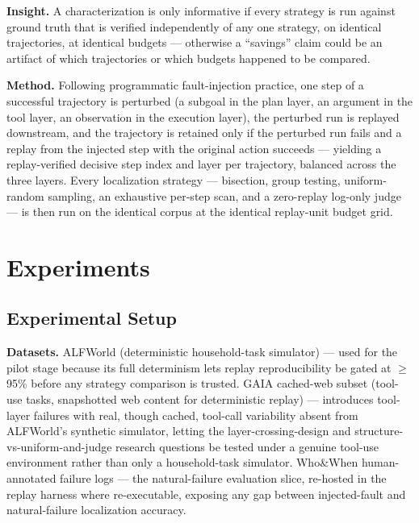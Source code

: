 \documentclass[11pt]{article}
\begin{document}
\textbf{Insight.} A characterization is only informative if every strategy is run against ground truth that is verified independently of any one strategy, on identical trajectories, at identical budgets --- otherwise a ``savings'' claim could be an artifact of which trajectories or which budgets happened to be compared.

\textbf{Method.} Following programmatic fault-injection practice, one step of a successful trajectory is perturbed (a subgoal in the plan layer, an argument in the tool layer, an observation in the execution layer), the perturbed run is replayed downstream, and the trajectory is retained only if the perturbed run fails and a replay from the injected step with the original action succeeds --- yielding a replay-verified decisive step index and layer per trajectory, balanced across the three layers. Every localization strategy --- bisection, group testing, uniform-random sampling, an exhaustive per-step scan, and a zero-replay log-only judge --- is then run on the identical corpus at the identical replay-unit budget grid.

\section{Experiments}

\subsection{Experimental Setup}

\textbf{Datasets.} ALFWorld (deterministic household-task simulator) --- used for the pilot stage because its full determinism lets replay reproducibility be gated at $\geq$95\% before any strategy comparison is trusted. GAIA cached-web subset (tool-use tasks, snapshotted web content for deterministic replay) --- introduces tool-layer failures with real, though cached, tool-call variability absent from ALFWorld's synthetic simulator, letting the layer-crossing-design and structure-vs-uniform-and-judge research questions be tested under a genuine tool-use environment rather than only a household-task simulator. Who\&When \citep{WhoWhen2025} human-annotated failure logs --- the natural-failure evaluation slice, re-hosted in the replay harness where re-executable, exposing any gap between injected-fault and natural-failure localization accuracy.
\end{document}
